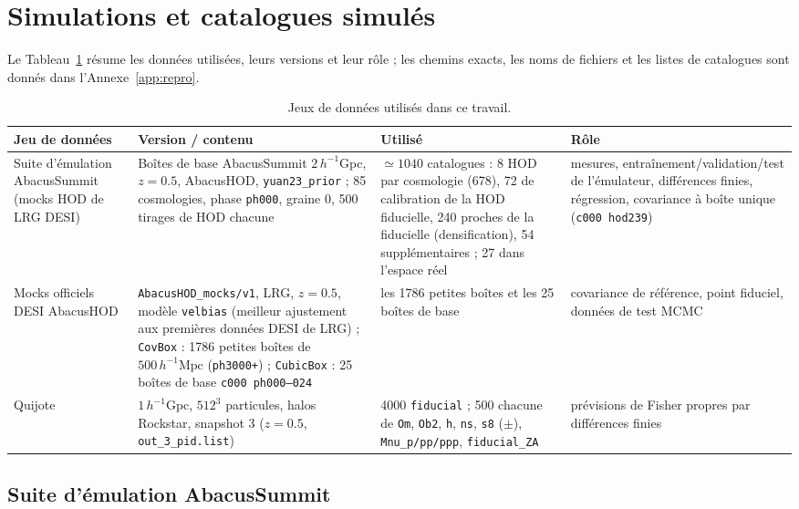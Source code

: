 \documentclass[11pt,twocolumn]{article}
\newcommand{\Mpch}{\,h^{-1}\mathrm{Mpc}}
\begin{document}
\section{Simulations et catalogues simulés}
\label{sec:sims}

Le Tableau~\ref{tab:datasets} résume les données utilisées, leurs versions et leur rôle ; les chemins exacts, les noms de fichiers et les listes de catalogues sont donnés dans l'Annexe~\ref{app:repro}.

\begin{table}[!tp]
\centering\small
\begin{tabular}{p{3.3cm}p{4.6cm}p{4.3cm}p{4.3cm}}
\toprule
Jeu de données & Version / contenu & Utilisé & Rôle \\
\midrule
Suite d'émulation AbacusSummit (mocks HOD de LRG DESI) & Boîtes de base AbacusSummit $2\,h^{-1}$Gpc, $z=0.5$, AbacusHOD, \texttt{yuan23\_prior} ; 85 cosmologies, phase \texttt{ph000}, graine 0, 500 tirages de HOD chacune & $\simeq1040$ catalogues : 8 HOD par cosmologie (678), 72 de calibration de la HOD fiducielle, 240 proches de la fiducielle (densification), 54 supplémentaires ; 27 dans l'espace réel & mesures, entraînement/validation/test de l'émulateur, différences finies, régression, covariance à boîte unique (\texttt{c000 hod239}) \\
Mocks officiels DESI AbacusHOD & \texttt{AbacusHOD\_mocks/v1}, LRG, $z=0.5$, modèle \texttt{velbias} (meilleur ajustement aux premières données DESI de LRG) ; \texttt{CovBox} : 1786 petites boîtes de $500\Mpch$ (\texttt{ph3000+}) ; \texttt{CubicBox} : 25 boîtes de base \texttt{c000 ph000--024} & les 1786 petites boîtes et les 25 boîtes de base & covariance de référence, point fiduciel, données de test MCMC \\
Quijote & $1\,h^{-1}$Gpc, $512^3$ particules, halos Rockstar, snapshot 3 ($z=0.5$, \texttt{out\_3\_pid.list}) & 4000 \texttt{fiducial} ; 500 chacune de \texttt{Om}, \texttt{Ob2}, \texttt{h}, \texttt{ns}, \texttt{s8} ($\pm$), \texttt{Mnu\_p/pp/ppp}, \texttt{fiducial\_ZA} & prévisions de Fisher propres par différences finies \\
\bottomrule
\end{tabular}
\caption{Jeux de données utilisés dans ce travail.}
\label{tab:datasets}
\end{table}

\subsection{Suite d'émulation AbacusSummit}
\end{document}
